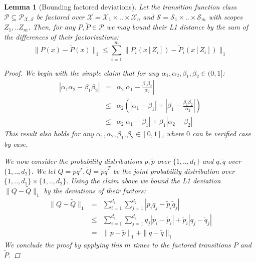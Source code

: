 \documentclass{article}
\newtheorem{lemma}{Lemma}
\newcommand{\Xc}{\mathcal{X}}
\newcommand{\Pc}{\mathcal{P}}
\newcommand{\Sc}{\mathcal{S}}
\begin{document}
\begin{lemma}[Bounding factored deviations]
\label{lem: factor bound} \hspace{0.000000001mm} \newline
Let the transition function class $\Pc \subseteq \Pc_{\Xc,\Sc}$ be factored over $\Xc = \Xc_1 \times .. \times \Xc_n$ and $\Sc = \Sc_1 \times .. \times \Sc_m$ with scopes  $Z_1, .. Z_m$.
Then, for any $P,\tilde{P} \in \Pc$ we may bound their L1 distance by the sum of the differences of their factorizations:
$$ \| P(x) - \tilde{P}(x) \|_1 \le \sum_{i=1}^m \|P_i(x[Z_i]) - \tilde{P}_i(x[Z_i]) \|_1 $$

\begin{proof}
We begin with the simple claim that for any $ \alpha_1, \alpha_2, \beta_1, \beta_2 \in (0,1]$:
\begin{eqnarray*}
	| \alpha_1 \alpha_2 - \beta_1 \beta_2 | &=& \alpha_2 \left| \alpha_1 - \frac{\beta_1 \beta_2}{\alpha_2} \right| \\
	&\le& \alpha_2 \left( \left|\alpha_1 - \beta_1 \right| + \left|\beta_1 - \frac{\beta_1 \beta_2}{\alpha_2} \right| \right) \\
	&\le& \alpha_2 \left| \alpha_1 - \beta_1 \right| + \beta_1 \left| \alpha_2 - \beta_2 \right|
\end{eqnarray*}
This result also holds for any $ \alpha_1, \alpha_2, \beta_1, \beta_2 \in [0,1]$, where $0$ can be verified case by case.

We now consider the probability distributions $p, \tilde{p} $ over $\{1,..,d_1\}$ and $q,\tilde{q} $ over $\{1,..,d_2\}$.
We let $Q = p q^T, \tilde{Q} = \tilde{p} \tilde{q}^T$ be the joint probability distribution over $\{1,..,d_1\} \times \{1,..,d_2\}$.
Using the claim above we bound the L1 deviation $\| Q - \tilde{Q} \|_1$ by the deviations of their factors:
\begin{eqnarray*}
	\| Q - \tilde{Q} \|_1 %
	&=& \sum_{i=1}^{d_1} \sum_{j=1}^{d_2} | p_i q_j - \tilde{p}_i \tilde{q}_j | \\
	&\le& \sum_{i=1}^{d_1} \sum_{j=1}^{d_2} q_j | p_i - \tilde{p}_i | + \tilde{p}_i | q_j - \tilde{q}_j | \\
	&=& \| p - \tilde{p} \|_1 + \|q - \tilde{q} \|_1
\end{eqnarray*}
We conclude the proof by applying this $m$ times to the factored transitions $P$ and $\tilde{P}$.
\end{proof}
\end{lemma}
\end{document}
